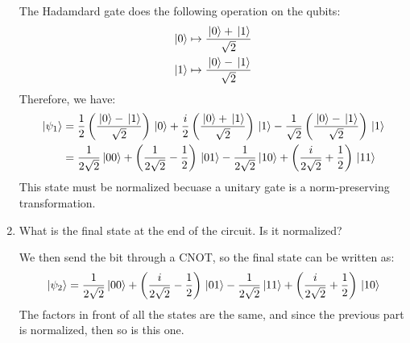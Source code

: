 \documentclass[10pt]{article}
\begin{document}
\begin{enumerate}[label=\alph*)]
			\begin{solution}
				The Hadamdard gate does the following operation on the qubits:
				\begin{align*}
					\ket*{0} &\mapsto \frac{\ket*{0} + \ket*{1}}{\sqrt{2} }\\
					\ket*{1} &\mapsto \frac{\ket*{0} - \ket*{1}}{\sqrt{2} }
				\end{align*}
				Therefore, we have: 
				\begin{align*}
					\ket*{\psi_1}&= \frac{1}{2}\left( \frac{\ket*{0} - \ket*{1}}{\sqrt{2}} \right)\ket*{0}
					+ \frac{i}{2}\left( \frac{\ket*{0} + \ket*{1}}{\sqrt{2} } \right) \ket*{1}
					- \frac{1}{\sqrt{2} }\left( \frac{\ket*{0} -\ket*{1}}{\sqrt{2} } \right) \ket*{1}\\
					&= \frac{1}{2\sqrt{2} }\ket*{00} + \left( \frac{1}{2\sqrt{2} } - \frac{1}{2} \right) \ket*{01}
					- \frac{1}{2\sqrt{2} }\ket*{10} + \left( \frac{i}{2\sqrt{2} } + \frac{1}{2} \right) \ket*{11}
				\end{align*} 
				This state must be normalized becuase a unitary gate is a norm-preserving transformation.
			\end{solution}
		\item What is the final state at the end of the circuit. Is it normalized?

			\begin{solution}
				We then send the bit through a CNOT, so the final state can be written as:
				\[
				\ket*{\psi_2} = \frac{1}{2\sqrt{2} }\ket*{00} + \left( \frac{i}{2\sqrt{2} } - \frac{1}{2} \right) 
				\ket*{01} - \frac{1}{2\sqrt{2} }\ket*{11} + \left( \frac{i}{2\sqrt{2} } + \frac{1}{2} \right) \ket*{10}
				\] 
				The factors in front of all the states are the same, and since the previous part is normalized, 
				then so is this one.
			\end{solution}
	 \end{enumerate}
	 \pagebreak
\end{document}
